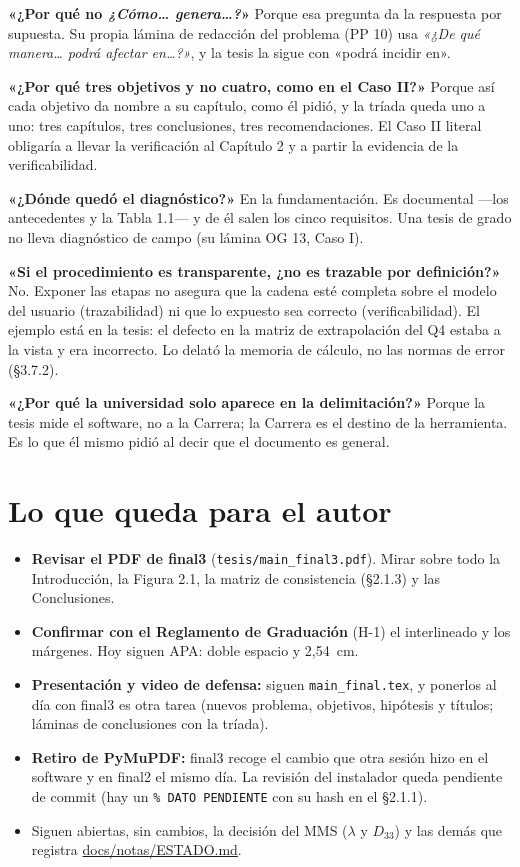 \documentclass[11pt,a4paper]{article}
\begin{document}
\textbf{«¿Por qué no \emph{¿Cómo\ldots{} genera\ldots?}»} Porque esa pregunta da la respuesta por supuesta. Su propia lámina de redacción del problema (PP 10) usa \emph{«¿De qué manera\ldots{} podrá afectar en\ldots?»}, y la tesis la sigue con «podrá incidir en».

\textbf{«¿Por qué tres objetivos y no cuatro, como en el Caso II?»} Porque así cada objetivo da nombre a su capítulo, como él pidió, y la tríada queda uno a uno: tres capítulos, tres conclusiones, tres recomendaciones. El Caso II literal obligaría a llevar la verificación al Capítulo 2 y a partir la evidencia de la verificabilidad.

\textbf{«¿Dónde quedó el diagnóstico?»} En la fundamentación. Es documental ---los antecedentes y la Tabla 1.1--- y de él salen los cinco requisitos. Una tesis de grado no lleva diagnóstico de campo (su lámina OG 13, Caso I).

\textbf{«Si el procedimiento es transparente, ¿no es trazable por definición?»} No. Exponer las etapas no asegura que la cadena esté completa sobre el modelo del usuario (trazabilidad) ni que lo expuesto sea correcto (verificabilidad). El ejemplo está en la tesis: el defecto en la matriz de extrapolación del Q4 estaba a la vista y era incorrecto. Lo delató la memoria de cálculo, no las normas de error (§3.7.2).

\textbf{«¿Por qué la universidad solo aparece en la delimitación?»} Porque la tesis mide el software, no a la Carrera; la Carrera es el destino de la herramienta. Es lo que él mismo pidió al decir que el documento es general.

\section{Lo que queda para el autor}

\begin{itemize}
    \item \textbf{Revisar el PDF de final3} (\texttt{tesis/main\_final3.pdf}). Mirar sobre todo la Introducción, la Figura 2.1, la matriz de consistencia (§2.1.3) y las Conclusiones.
    \item \textbf{Confirmar con el Reglamento de Graduación} (H-1) el interlineado y los márgenes. Hoy siguen APA: doble espacio y 2,54~cm.
    \item \textbf{Presentación y video de defensa:} siguen \texttt{main\_final.tex}, y ponerlos al día con final3 es otra tarea (nuevos problema, objetivos, hipótesis y títulos; láminas de conclusiones con la tríada).
    \item \textbf{Retiro de PyMuPDF:} final3 recoge el cambio que otra sesión hizo en el software y en final2 el mismo día. La revisión del instalador queda pendiente de commit (hay un \texttt{\% DATO PENDIENTE} con su hash en el §2.1.1).
    \item Siguen abiertas, sin cambios, la decisión del MMS ($\lambda$ y $D_{33}$) y las demás que registra \url{docs/notas/ESTADO.md}.
\end{itemize}
\end{document}

